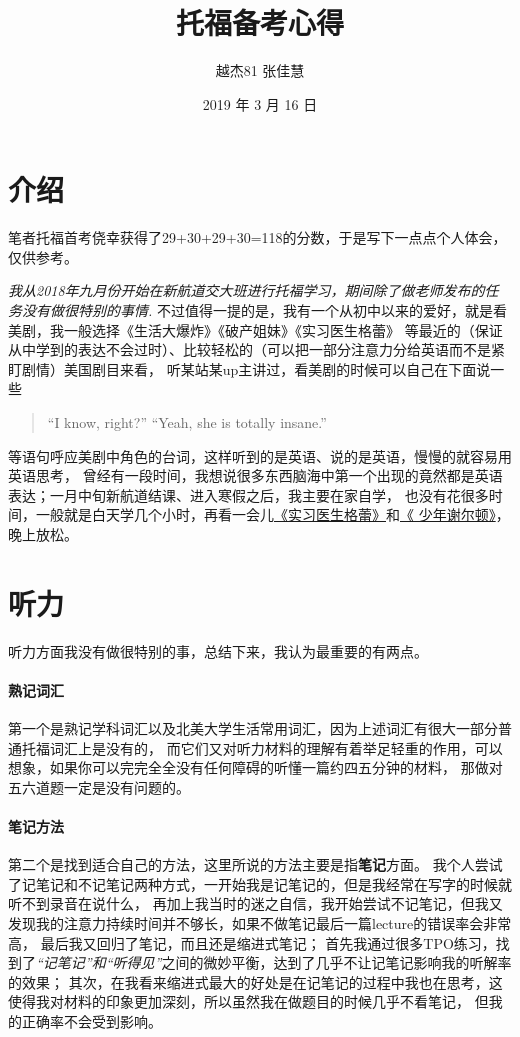 \documentclass[blue,cn]{elegantbookex}
\title{托福备考心得}
\author{越杰81  张佳慧}
\institute{小破楼资料编写小组\LaTeX}
\date{2019 年 3 月 16 日}
\begin{document}
\maketitle
\newpage
\tableofcontents
\newpage
\section{介绍}

    \begin{flushright}
        笔者托福首考侥幸获得了29+30+29+30=118的分数，于是写下一点点个人体会，仅供参考。
    \end{flushright}
    
    \emph{我从2018年九月份开始在新航道交大班进行托福学习，期间除了做老师发布的任务没有做很特别的事情.}
    不过值得一提的是，我有一个从初中以来的爱好，就是看美剧，我一般选择《生活大爆炸》《破产姐妹》《实习医生格蕾》
    等最近的（保证从中学到的表达不会过时）、比较轻松的（可以把一部分注意力分给英语而不是紧盯剧情）美国剧目来看，
    听某站某up主讲过，看美剧的时候可以自己在下面说一些
    \begin{quote}
        “I know, right?” 
        “Yeah, she is totally insane.”
    \end{quote}
    等语句呼应美剧中角色的台词，这样听到的是英语、说的是英语，慢慢的就容易用英语思考，
    曾经有一段时间，我想说很多东西脑海中第一个出现的竟然都是英语表达；一月中旬新航道结课、进入寒假之后，我主要在家自学，
    也没有花很多时间，一般就是白天学几个小时，再看一会儿\underline{《实习医生格蕾》}和\underline{《 少年谢尔顿》}，晚上放松。

\section{听力}

    听力方面我没有做很特别的事，总结下来，我认为最重要的有两点。


\paragraph{熟记词汇}
    第一个是熟记学科词汇以及北美大学生活常用词汇，因为上述词汇有很大一部分普通托福词汇上是没有的，
    而它们又对听力材料的理解有着举足轻重的作用，可以想象，如果你可以完完全全没有任何障碍的听懂一篇约四五分钟的材料，
    那做对五六道题一定是没有问题的。

\paragraph{笔记方法}
    第二个是找到适合自己的方法，这里所说的方法主要是指\textbf{笔记}方面。
    我个人尝试了记笔记和不记笔记两种方式，一开始我是记笔记的，但是我经常在写字的时候就听不到录音在说什么，
    再加上我当时的迷之自信，我开始尝试不记笔记，但我又发现我的注意力持续时间并不够长，如果不做笔记最后一篇lecture的错误率会非常高，
    最后我又回归了笔记，而且还是缩进式笔记；
    首先我通过很多TPO练习，找到了\textit{“记笔记”和“听得见”}之间的微妙平衡，达到了几乎不让记笔记影响我的听解率的效果；
    其次，在我看来缩进式最大的好处是在记笔记的过程中我也在思考，这使得我对材料的印象更加深刻，所以虽然我在做题目的时候几乎不看笔记，
    但我的正确率不会受到影响。
\end{document}
